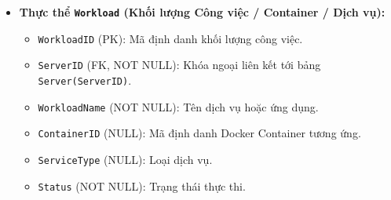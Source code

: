 \begin{itemize}[leftmargin=2em]
\begin{itemize}
        \item \texttt{ServerID} (PK): Mã định danh duy nhất của Máy chủ.
        \item \texttt{RackID} (FK, NOT NULL): Khóa ngoại liên kết tới bảng \texttt{Rack(RackID)}.
        \item \texttt{ServerName} (NOT NULL): Tên máy chủ/Node.
        \item \texttt{IPAddress} (NOT NULL): Địa chỉ IP quản lý mạng.
        \item \texttt{QRCodeStamp} (NULL): Mã nhận diện QR Code / ArUco Marker để ứng dụng AR quét thực địa.
        \item \texttt{UPosition} (NULL): Vị trí đặt máy chủ trong tủ Rack.
        \item \texttt{Status} (NOT NULL): Trạng thái hoạt động.
    \end{itemize}
    \item \textbf{Thực thể \texttt{Workload} (Khối lượng Công việc / Container / Dịch vụ):}
    \begin{itemize}
        \item \texttt{WorkloadID} (PK): Mã định danh khối lượng công việc.
        \item \texttt{ServerID} (FK, NOT NULL): Khóa ngoại liên kết tới bảng \texttt{Server(ServerID)}.
        \item \texttt{WorkloadName} (NOT NULL): Tên dịch vụ hoặc ứng dụng.
        \item \texttt{ContainerID} (NULL): Mã định danh Docker Container tương ứng.
        \item \texttt{ServiceType} (NULL): Loại dịch vụ.
        \item \texttt{Status} (NOT NULL): Trạng thái thực thi.
    \end{itemize}
\end{itemize}

